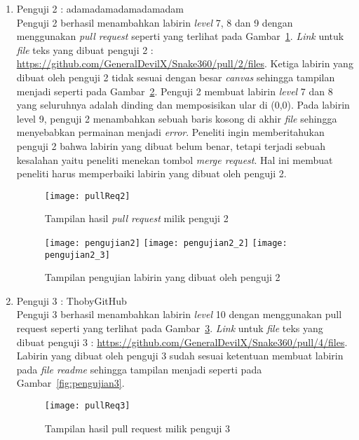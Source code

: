 \begin{enumerate}
	\item Penguji 2 : adamadamadamadamadam\\
	Penguji 2 berhasil menambahkan labirin \textit{level} 7, 8 dan 9 dengan menggunakan \textit{pull request} seperti yang terlihat pada Gambar~\ref{fig:pullReq2}. \textit{Link} untuk \textit{file} teks yang dibuat penguji 2 : \url{https://github.com/GeneralDevilX/Snake360/pull/2/files}. Ketiga labirin yang dibuat oleh penguji 2 tidak sesuai dengan besar \textit{canvas} sehingga tampilan menjadi seperti pada Gambar~\ref{fig:pengujian2}. Penguji 2 membuat labirin \textit{level} 7 dan 8 yang seluruhnya adalah dinding dan memposisikan ular di (0,0). Pada labirin level 9, penguji 2 menambahkan sebuah baris kosong di akhir \textit{file} sehingga menyebabkan permainan menjadi \textit{error}. Peneliti ingin memberitahukan penguji 2 bahwa labirin yang dibuat belum benar, tetapi terjadi sebuah kesalahan yaitu peneliti menekan tombol \textit{merge request}. Hal ini membuat peneliti harus memperbaiki labirin yang dibuat oleh penguji 2.
	
	\begin{figure}[H]
		\centering  
		\texttt{[image: pullReq2]}  
		\caption[Tampilan hasil \textit{pull request} milik penguji 2]{Tampilan hasil \textit{pull request} milik penguji 2}
		\label{fig:pullReq2} 
	\end{figure}
	
	\begin{figure}[H]
		\centering  
		\texttt{[image: pengujian2]}
		\texttt{[image: pengujian2\_2]}
		\texttt{[image: pengujian2\_3]}
		\caption[Tampilan pengujian labirin yang dibuat oleh penguji 2]{Tampilan pengujian labirin yang dibuat oleh penguji 2}
		\label{fig:pengujian2} 
	\end{figure}
	
	\item Penguji 3 : ThobyGitHub\\
	Penguji 3 berhasil menambahkan labirin \textit{level} 10 dengan menggunakan pull request seperti yang terlihat pada Gambar~\ref{fig:pullReq3}. \textit{Link} untuk \textit{file} teks yang dibuat penguji 3 : \url{https://github.com/GeneralDevilX/Snake360/pull/4/files}. Labirin yang dibuat oleh penguji 3 sudah sesuai ketentuan membuat labirin pada \textit{file readme} sehingga tampilan menjadi seperti pada Gambar~\ref{fig:pengujian3}.
	
	\begin{figure}[H]
		\centering  
		\texttt{[image: pullReq3]}  
		\caption[Tampilan hasil pull request milik penguji 3]{Tampilan hasil pull request milik penguji 3}
		\label{fig:pullReq3} 
	\end{figure}
	

\end{enumerate}
